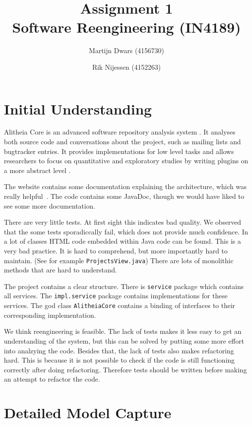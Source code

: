 \documentclass{article}
\author{Martijn Dwars (4156730) \and Rik Nijessen (4152263)}
\title{Assignment 1 \\ Software Reengineering (IN4189)}
\begin{document}
\maketitle

\section{Initial Understanding}
Alitheia Core is an advanced software repository analysis system \cite{sqooss-docs}. It analyses both source code and conversations about the project, such as mailing lists and bugtracker entries. It provides implementations for low level tasks and allows researchers to focus on quantitative and exploratory studies by writing plugins on a more abstract level \cite{sqooss-about}.


The website contains some documentation explaining the architecture, which was really helpful~\cite{sqooss-reference}. The code contains some JavaDoc, though we would have liked to see some more documentation.

There are very little tests. At first sight this indicates bad quality. We observed that the some tests sporadiccally fail, which does not provide much confidence.
In a lot of classes HTML code embedded within Java code can be found. This is a very bad practice. It is hard to comprehend, but more importantly hard to maintain. (See for example \verb|ProjectsView.java|) There are lots of monolithic methods that are hard to understand.

The project contains a clear structure. There is \verb|service| package which contains all services. The \verb|impl.service| package contains implementations for these services. The god class \verb|AlitheiaCore| contains a binding of interfaces to their corresponding implementation.

We think reengineering is feasible. The lack of tests makes it less easy to get an understanding of the system, but this can be solved by putting some more effort into analzying the code. Besides that, the lack of tests also makes refactoring hard. This is because it is not possible to check if the code is still functioning correctly after doing refactoring. Therefore tests should be written before making an attempt to refactor the code.

\section{Detailed Model Capture}
\end{document}
